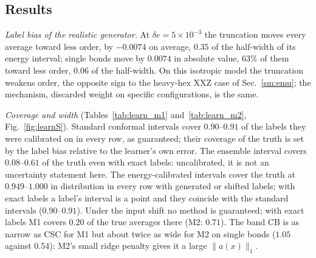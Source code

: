 \documentclass[aps,prx,onecolumn,10pt,nofootinbib,longbibliography,floatfix]{revtex4-2}
\theoremstyle{remark}
\newcommand{\de}{\delta e}
\begin{document}
\subsection{Results}

\emph{Label bias of the realistic generator.} At $\de=5\times10^{-3}$ the truncation moves every average toward less %
order, by $-0.0074$ on average, $0.35$ of the half-width of its energy interval; single bonds move by $0.0074$ in absolute value, %
$63\%$ of them toward less order, $0.06$ of the half-width. On this isotropic model the truncation weakens order, %
the opposite sign to the heavy-hex XXZ case of Sec.~\ref{sm:emu}; the mechanism, discarded weight on specific
configurations, is the same.

\emph{Coverage and width} (Tables~\ref{tab:learn_m1} and~\ref{tab:learn_m2}, Fig.~\ref{fig:learnS}). Standard
conformal intervals cover $0.90$--$0.91$ of the labels they were calibrated on in every row, as guaranteed; their %
coverage of the truth is set by the label bias relative to the learner's own error. The ensemble interval covers
$0.08$--$0.61$ of the truth even with exact labels: uncalibrated, it is not an uncertainty statement here. The %
energy-calibrated intervals cover the truth at $0.949$--$1.000$ in distribution in every row with generated or shifted %
labels; with exact labels a label's interval is a point and they coincide with the standard intervals
($0.90$--$0.91$). Under the input shift no %
method is guaranteed; with exact labels M1 covers $0.20$ of the true averages there (M2: $0.71$). The %
band CB is as narrow as CSC for M1 but about twice as wide for M2 on single bonds ($1.05$ against $0.54$): M2's %
small ridge penalty gives it a large $\|a(x)\|_1$.
\end{document}

